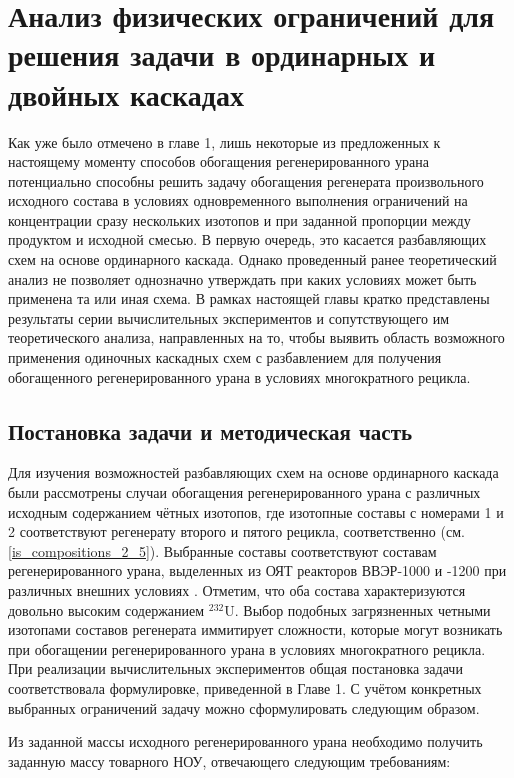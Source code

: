 \chapter{Анализ физических ограничений для решения задачи в ординарных и двойных каскадах}\label{ch:ch2}

Как уже было отмечено в главе 1, лишь некоторые из предложенных к настоящему моменту способов обогащения регенерированного урана потенциально способны решить задачу обогащения регенерата произвольного исходного состава в условиях одновременного выполнения ограничений на концентрации сразу нескольких изотопов и при заданной пропорции между продуктом и исходной смесью. В первую очередь, это касается разбавляющих схем на основе ординарного каскада. 
Однако проведенный ранее теоретический анализ не позволяет однозначно утверждать при каких условиях может быть применена та или иная схема. В рамках настоящей главы кратко представлены результаты серии вычислительных экспериментов и сопутствующего им теоретического анализа, направленных на то, чтобы выявить область возможного применения одиночных каскадных схем с разбавлением для получения обогащенного регенерированного урана в условиях многократного рецикла. 

\section{Постановка задачи и методическая часть}

Для изучения возможностей разбавляющих схем на основе ординарного каскада были рассмотрены случаи обогащения регенерированного урана с различных исходным содержанием чётных изотопов, где изотопные составы с номерами 1 и 2 соответствуют регенерату второго и пятого рецикла, соответственно (см. \ref{is_compositions_2_5}). Выбранные составы соответствуют составам регенерированного урана, выделенных из ОЯТ реакторов ВВЭР-1000 и -1200 при различных внешних условиях \cite{palkinDesignanalyticalResearchRefinement2010,nevinicaToplivnyyCiklLegkovodnogo2019}. Отметим, что оба состава характеризуются довольно высоким содержанием $^{232}$U. Выбор подобных загрязненных четными изотопами составов регенерата иммитирует сложности, которые могут возникать при обогащении регенерированного урана в условиях многократного рецикла.  
При реализации вычислительных экспериментов общая постановка задачи соответствовала формулировке, приведенной в Главе 1. С учётом конкретных выбранных ограничений задачу можно сформулировать следующим образом.

Из заданной массы исходного регенерированного урана необходимо получить заданную массу товарного НОУ, отвечающего следующим требованиям:

